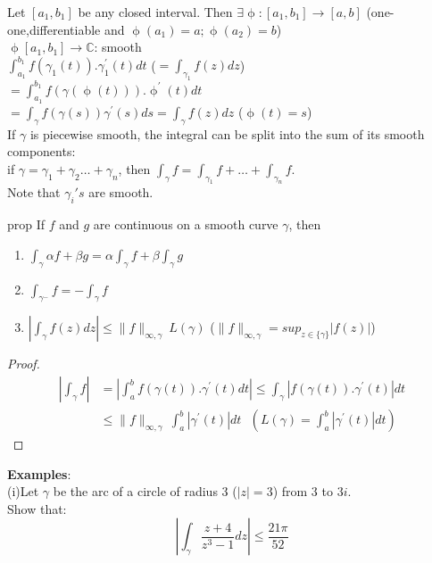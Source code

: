Let $[a_1,b_1]$ be any closed interval. Then $\exists \upphi:[a_1,b_1]\rightarrow [a,b]$ (one-one,differentiable and $\upphi(a_1)=a;\upphi(a_2)=b$)\\
$\upphi[a_1,b_1] \rightarrow \mathds{C}$: smooth \\
$\int_{a_1}^{b_1}f(\gamma_1(t)).\gamma_1^{'}(t)dt$ \: ($=\int_{\gamma_1}^{}f(z) dz$)\\
$=\int_{a_1}^{b_1}f(\gamma(\upphi(t))).\upphi^{'}(t) dt$\\
$=\int_{\gamma}^{} f(\gamma(s)) \gamma^{'}(s) ds=\int_{\gamma}^{}f(z) dz$ \: ($\upphi(t)=s$)\\
If $\gamma$ is piecewise smooth, the integral can be split into the sum of its smooth components:\\
if $\gamma=\gamma_1+\gamma_2 \dots +\gamma_n$, then $\int_{\gamma}^{} f = \int_{\gamma_1}^{} f + \dots + \int_{\gamma_n}^{} f$.\\
Note that $\gamma_i's$ are smooth.
\begin{restatable}[]{prop}{}\label{}
If $f$ and $g$ are continuous on a smooth curve $\gamma$, then 
\begin{enumerate}
    \item $\int_{\gamma}^{} \alpha f+\beta g = \alpha \int_{\gamma}^{} f + \beta\int_{\gamma}^{} g$
    \item $\int_{\gamma^{-}}^{} f = - \int_{\gamma}^{} f$
    \item $|\int_{\gamma}^{} f(z) dz| \leq \|f\|_{\infty,\gamma} \: L(\gamma)$ \: ($\|f\|_{\infty,\gamma}=sup_{z\in \{\gamma\}}|f(z)|$)
\end{enumerate}
\end{restatable}
\begin{proof}
\begin{equation*}    
\begin{split}    
|\int_{\gamma}^{} f|&= |\int_{a}^{b} f(\gamma(t)).\gamma^{'}(t) dt| \leq \int_{\gamma}^{} |f(\gamma(t)).\gamma^{'}(t)| dt\\
&\leq \|f\|_{\infty,\gamma}\:  \int_{a}^{b} |\gamma^{'}(t)| dt  \: \:\: (L(\gamma)=\int_{a}^{b} |\gamma^{'}(t)| dt)
\end{split}
\end{equation*}
\end{proof}
\textbf{Examples}: \\
(i)Let $\gamma$ be the arc of a circle of radius 3 ($|z|=3$) from $3$ to $3i$.\\
Show that:\\
$$|\int_{\gamma}^{} \frac{z+4}{z^3-1} dz| \leq \frac{21\pi}{52}$$\\
